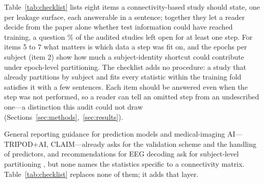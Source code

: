 
Table~\ref{tab:checklist} lists eight items a connectivity-based study should state, one per leakage surface, each answerable in a sentence; together they let a reader decide from the paper alone whether test information could have reached training, a question \PctUnclearAny\% of the audited studies left open for at least one step. For items 5 to 7 what matters is which data a step was fit on, and the epochs per subject (item 2) show how much a subject-identity shortcut could contribute under epoch-level partitioning. The checklist adds no procedure: a study that already partitions by subject and fits every statistic within the training fold satisfies it with a few sentences. Each item should be answered even when the step was not performed, so a reader can tell an omitted step from an undescribed one---a distinction this audit could not draw (Sections~\ref{sec:methods},~\ref{sec:results}).

General reporting guidance for prediction models and medical-imaging AI---TRIPOD+AI, CLAIM---already asks for the validation scheme and the handling of predictors, and recommendations for EEG decoding ask for subject-level partitioning \cite{brookshire2024}, but none names the statistics specific to a connectivity matrix. Table~\ref{tab:checklist} replaces none of them; it adds that layer.

